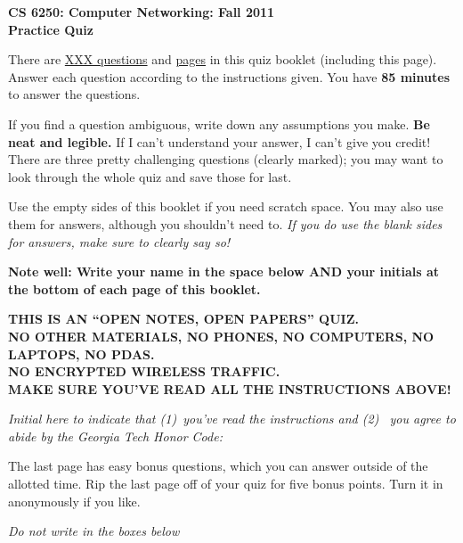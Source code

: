 \documentclass[11pt]{article}
\begin{document}
\begin{center}
{\Large{\bf CS 6250: Computer Networking: Fall 2011} \\
 \vspace{.15in} \Huge{\bf Practice Quiz}} 
\vspace{.2in}

\begin{boxedminipage}[h]{6in}
There are \underline{XXX questions} and
  \underline{\pageref{lastpage} pages} in this quiz booklet (including
  this page).  Answer each question according to the instructions given.
  You have {\bf 85 minutes} to answer the questions.



\vspace{.1in} 
If you find a question ambiguous, write down any
assumptions you make.  {\bf Be neat and legible.}  If I can't
understand your answer, I can't give you credit!  There are three pretty
challenging questions (clearly marked); you may want to look through the
whole quiz and save those for last.

\vspace{.1in} 
Use the empty sides of this booklet if you need scratch space.  You
may also use them for answers, although you shouldn't need to.  {\em If you
do use the blank sides for answers, make sure to clearly say so!}

\vspace{.1in} 
{\bf Note well: Write your name in the space below AND your initials at the bottom of each
page of this booklet.}

\begin{center}{\bf THIS IS AN ``OPEN NOTES, OPEN PAPERS'' QUIZ.\\
NO OTHER MATERIALS, NO PHONES, NO COMPUTERS, NO LAPTOPS, NO PDAS.\\
NO ENCRYPTED WIRELESS TRAFFIC. \\
MAKE SURE YOU'VE READ ALL THE INSTRUCTIONS ABOVE!}
\end{center}
{\em Initial here to indicate that (1)~you've read the instructions and (2)~
you agree to abide by the Georgia Tech Honor Code: }



\vspace{.1in} The last page has easy bonus questions, which you can
answer outside of the allotted time.  Rip the last page off of your
quiz for five bonus points.  Turn it in anonymously if you like.

\end{boxedminipage}
\end{center}
\vspace*{0.25in}
\begin{center}
{\it Do not write in the boxes below}
\end{center}
\end{document}
